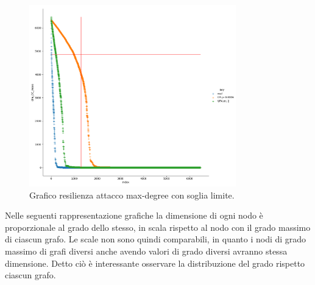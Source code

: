 \documentclass{article}
\begin{document}
\begin{figure}[H]
	\centering
	\includegraphics[width=0.80\textwidth]{figures/figure_maxdegree_line}
	\caption{Grafico resilienza attacco max-degree con soglia limite.}
\end{figure}
\newpage
\noindent Nelle seguenti rappresentazione grafiche la dimensione di ogni nodo è proporzionale al grado dello stesso, in scala rispetto al nodo con il grado massimo di ciascun grafo.
Le scale non sono quindi comparabili, in quanto i nodi di grado massimo di grafi diversi anche avendo valori di grado diversi avranno stessa dimensione. 
Detto ciò è interessante osservare la distribuzione del grado rispetto ciascun grafo. 
\end{document}
